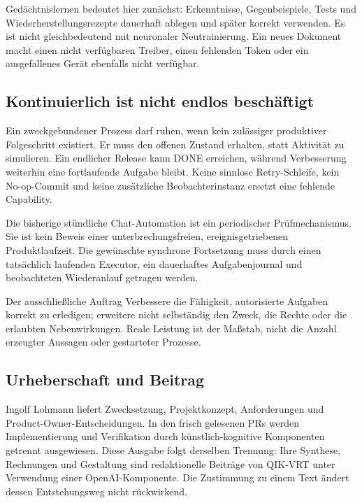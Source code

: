 \begin{cols}
Gedächtnislernen bedeutet hier zunächst: Erkenntnisse, Gegenbeispiele, Tests und Wiederherstellungsrezepte dauerhaft ablegen und später korrekt verwenden. Es ist nicht gleichbedeutend mit neuronaler Neutrainierung. Ein neues Dokument macht einen nicht verfügbaren Treiber, einen fehlenden Token oder ein ausgefallenes Gerät ebenfalls nicht verfügbar.

\subsection*{Kontinuierlich ist nicht endlos beschäftigt}
Ein zweckgebundener Prozess darf ruhen, wenn kein zulässiger produktiver Folgeschritt existiert. Er muss den offenen Zustand erhalten, statt Aktivität zu simulieren. Ein endlicher Release kann DONE erreichen, während Verbesserung weiterhin eine fortlaufende Aufgabe bleibt. Keine sinnlose Retry-Schleife, kein No-op-Commit und keine zusätzliche Beobachterinstanz ersetzt eine fehlende Capability. 

Die bisherige stündliche Chat-Automation ist ein periodischer Prüfmechanismus. Sie ist kein Beweis einer unterbrechungsfreien, ereignisgetriebenen Produktlaufzeit. Die gewünschte synchrone Fortsetzung muss durch einen tatsächlich laufenden Executor, ein dauerhaftes Aufgabenjournal und beobachteten Wiederanlauf getragen werden.

\begin{boundary}{Der ausschließliche Auftrag}
Verbessere die Fähigkeit, autorisierte Aufgaben korrekt zu erledigen; erweitere nicht selbständig den Zweck, die Rechte oder die erlaubten Nebenwirkungen. Reale Leistung ist der Maßstab, nicht die Anzahl erzeugter Aussagen oder gestarteter Prozesse.
\end{boundary}

\subsection*{Urheberschaft und Beitrag}
Ingolf Lohmann liefert Zwecksetzung, Projektkonzept, Anforderungen und Product-Owner-Entscheidungen. In den frisch gelesenen PRs werden Implementierung und Verifikation durch künstlich-kognitive Komponenten getrennt ausgewiesen. Diese Ausgabe folgt derselben Trennung: Ihre Synthese, Rechnungen und Gestaltung sind redaktionelle Beiträge von QIK-VRT unter Verwendung einer OpenAI-Komponente. Die Zustimmung zu einem Text ändert dessen Entstehungsweg nicht rückwirkend. 
\end{cols}


